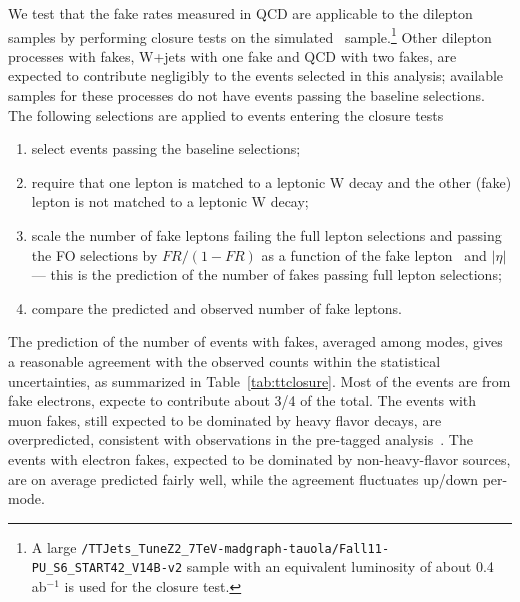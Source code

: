We test that the fake rates measured in QCD are applicable to the dilepton samples by performing closure
tests on the simulated \ttbar\ sample.\footnote{A large {\tt /TTJets\_TuneZ2\_7TeV-madgraph-tauola/Fall11-PU\_S6\_START42\_V14B-v2} 
sample with an equivalent luminosity of about 0.4 ab$^{-1}$ is used for the closure test.}
Other dilepton processes with fakes, W+jets with one fake and QCD with two fakes, are expected
to contribute negligibly to the events selected in this analysis;
available samples for these processes do not have events passing the baseline selections.
The following selections are applied to events entering the closure tests
\begin{enumerate}
\item select events passing the baseline selections;
\item require that one lepton is matched to a leptonic W decay and the other (fake) lepton is not
matched to a leptonic W decay;
\item scale the number of fake leptons failing the full lepton selections and passing the FO selections
	by $FR/(1-FR)$ as a function of the fake lepton \pt\ and $|\eta|$ --- this is the prediction
	of the number of fakes passing full lepton selections;
\item compare the predicted and observed number of fake leptons.
\end{enumerate}
The prediction of the number of events with fakes,
averaged among modes, gives a reasonable agreement with the observed counts
within the statistical uncertainties, as summarized in Table~\ref{tab:ttclosure}.
Most of the events are from fake electrons, expecte to contribute about 3/4 of the total.
The events with muon fakes, still expected to be dominated by heavy flavor decays,
are overpredicted, consistent with observations in the pre-tagged analysis~\cite{ssnote2011}.
The events with electron fakes, expected to be dominated by non-heavy-flavor sources,
are on average predicted fairly well, while the agreement fluctuates up/down per-mode.

